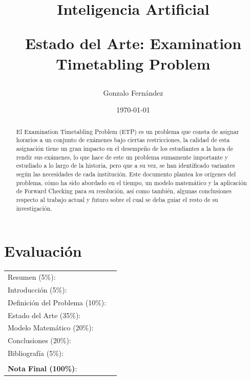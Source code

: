 \documentclass[letter, 10pt]{article}
\begin{document}
\title{Inteligencia Artificial \\ \begin{Large}Estado del Arte: Examination Timetabling Problem\end{Large}}
\author{Gonzalo Fernández}
\date{\today}
\maketitle


\section*{Evaluación}

\begin{tabular}{ll}
Resumen (5\%): & \underline{\hspace{2cm}} \\
Introducción (5\%):  & \underline{\hspace{2cm}} \\
Definición del Problema (10\%):  & \underline{\hspace{2cm}} \\
Estado del Arte (35\%):  & \underline{\hspace{2cm}} \\
Modelo Matemático (20\%): &  \underline{\hspace{2cm}}\\
Conclusiones (20\%): &  \underline{\hspace{2cm}}\\
Bibliografía (5\%): & \underline{\hspace{2cm}}\\
 &  \\
\textbf{Nota Final (100\%)}:   & \underline{\hspace{2cm}}
\end{tabular}
\vspace{2cm}


\begin{abstract}
El Examination Timetabling Problem (ETP) es un problema que consta de asignar horarios a un conjunto de exámenes bajo ciertas restricciones, la calidad de esta asignación tiene un gran impacto en el desempeño de los estudiantes a la hora de rendir sus exámenes, lo que hace de este un problema sumamente importante y estudiado a lo largo de la historia, pero que a su vez, se han identificado variantes según las necesidades de cada institución. Este documento plantea los orígenes del problema, cómo ha sido abordado en el tiempo, un modelo matemático y la aplicación de Forward Checking para su resolución, así como también, algunas conclusiones respecto al trabajo actual y futuro sobre el cual se deba guiar el resto de su investigación.
\end{abstract}
\end{document}
